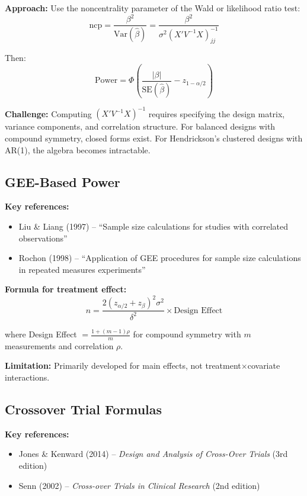 \documentclass[11pt]{article}
\theoremstyle{definition}
\begin{document}
\textbf{Approach:} Use the noncentrality parameter of the Wald or likelihood
ratio test:
\begin{equation}
\text{ncp} = \frac{\beta^2}{\text{Var}(\hat{\beta})} =
\frac{\beta^2}{\sigma^2 (X'V^{-1}X)^{-1}_{jj}}
\end{equation}

Then:
\begin{equation}
\text{Power} = \Phi\left(\frac{|\beta|}{\text{SE}(\hat{\beta})} - z_{1-\alpha/2}\right)
\end{equation}

\textbf{Challenge:} Computing $(X'V^{-1}X)^{-1}$ requires specifying the design
matrix, variance components, and correlation structure. For balanced designs
with compound symmetry, closed forms exist. For Hendrickson's clustered designs
with AR(1), the algebra becomes intractable.

\subsection{GEE-Based Power}

\textbf{Key references:}
\begin{itemize}
    \item Liu \& Liang (1997) -- ``Sample size calculations for studies with
    correlated observations''
    \item Rochon (1998) -- ``Application of GEE procedures for sample size
    calculations in repeated measures experiments''
\end{itemize}

\textbf{Formula for treatment effect:}
\begin{equation}
n = \frac{2(z_{\alpha/2} + z_{\beta})^2 \sigma^2}{\delta^2} \times \text{Design Effect}
\end{equation}

where Design Effect $= \frac{1 + (m-1)\rho}{m}$ for compound symmetry with $m$
measurements and correlation $\rho$.

\textbf{Limitation:} Primarily developed for main effects, not
treatment$\times$covariate interactions.

\subsection{Crossover Trial Formulas}

\textbf{Key references:}
\begin{itemize}
    \item Jones \& Kenward (2014) -- \textit{Design and Analysis of Cross-Over
    Trials} (3rd edition)
    \item Senn (2002) -- \textit{Cross-over Trials in Clinical Research} (2nd edition)
\end{itemize}
\end{document}
